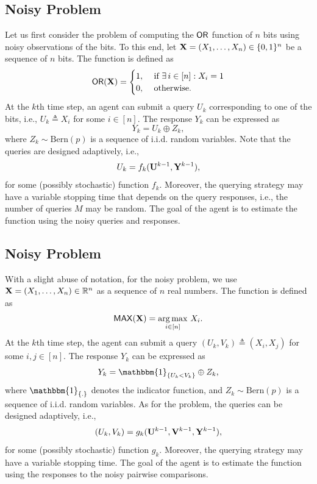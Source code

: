 \documentclass[journal, onecolumn]{IEEEtran}
\theoremstyle{plain}
\theoremstyle{definition}
\theoremstyle{remark}
\begin{document}
\subsection{Noisy \orn Problem}
Let us first consider the problem of computing the $\mathsf{OR}$ function of $n$ bits using noisy observations of the bits. To this end, let ${\bf X} = (X_1,\ldots,X_n) \in \{0,1\}^n$ be a sequence of $n$ bits. The \orn function is defined as
\begin{align}\label{eqn:def_or}
    \mathsf{OR}({\bf X}) = \begin{cases}1, & \text{ if } \exists \,i\in[n]: X_i = 1 \\ 
    0, & \text{ otherwise.}
    \end{cases}
\end{align}
At the $k$th time step, an agent can submit a query $U_k$ corresponding to one of the bits, i.e., $U_k \triangleq X_i$ for some $i \in [n]$. The response $Y_k$ can be expressed as
\[
Y_k = U_k \oplus Z_k,
\]
where $Z_k \sim \mathrm{Bern}(p)$ is a sequence of i.i.d. random variables. Note that the queries are designed adaptively, i.e.,
\[
U_k = f_k({\bf U}^{k-1},{\bf Y}^{k-1}),
\]
for some (possibly stochastic) function $f_k$. Moreover, the querying strategy may have a variable stopping time that depends on the query responses, i.e., the number of queries $M$ may be random. The goal of the agent is to estimate the \orn function using the noisy queries and responses. 

\subsection{Noisy \maxn Problem}
With a slight abuse of notation, for the noisy \maxn problem, we use ${\bf X} = (X_1,\ldots,X_n) \in \mathbb{R}^n$ as a sequence of $n$ real numbers. The \maxn function is defined as
\[
\mathsf{MAX}({\bf X})=\operatorname*{arg\,max}_{i\in[n]}\, X_i.
\]
At the $k$th time step, the agent can submit a query $(U_k,V_k) \triangleq (X_i,X_j)$ for some $i,j \in [n]$. The response $Y_k$ can be expressed as
\[
Y_k = \mathbbm{1}_{\{U_k <V_k\}} \oplus Z_k,
\]
where $\mathbbm{1}_{\{.\}}$ denotes the indicator function, and $Z_k \sim \mathrm{Bern}(p)$ is a sequence of i.i.d. random variables. As for the \orn problem, the queries can be designed adaptively, i.e.,
\[
(U_k,V_k) = g_k({\bf U}^{k-1},{\bf V}^{k-1},{\bf Y}^{k-1}),
\]
for some (possibly stochastic) function $g_k$. Moreover, the querying strategy may have a variable stopping time. The goal of the agent is to estimate the \maxn function using the responses to the noisy pairwise comparisons.
\end{document}
